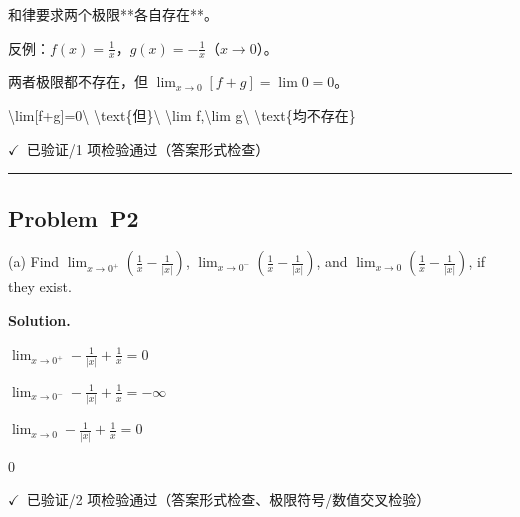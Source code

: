\documentclass[12pt, a4paper]{article}
\newcommand{\problem}[1]{\subsection*{Problem~#1}}
\newcommand{\solution}{%
  \par\noindent
  {\color{solutiongreen}\bfseries Solution.}\par
}
\newcommand{\verifyok}{\textcolor{solutiongreen}{\ensuremath{\checkmark}\ 已验证}}
\begin{document}
\begin{stepbox}
和律要求两个极限**各自存在**。
\end{stepbox}

\begin{stepbox}
反例：$f(x)=\frac1x$，$g(x)=-\frac1x$（$x\to0$）。
\end{stepbox}

\begin{stepbox}
两者极限都不存在，但 $\lim_{x\to0}[f+g]=\lim 0=0$。
\end{stepbox}

\begin{center}
\textbackslash{}lim[f+g]=0\textbackslash{} \textbackslash{}text\{但\}\textbackslash{} \textbackslash{}lim f,\textbackslash{}lim g\textbackslash{} \textbackslash{}text\{均不存在\}
\end{center}

\begin{verifybox}\small \verifyok{}/1 项检验通过（答案形式检查） \end{verifybox}

\vspace{0.8em}\hrule\vspace{0.8em}

\problem{P2}

\begin{stepbox}
(a) Find $\lim_{x \to 0^+}(\frac{1}{x} - \frac{1}{|x|})$, $\lim_{x \to 0^-}(\frac{1}{x} - \frac{1}{|x|})$, and $\lim_{x \to 0}(\frac{1}{x} - \frac{1}{|x|})$, if they exist.
\end{stepbox}

\solution

\begin{stepbox}
$\lim_{x \to 0^+} - \frac{1}{\left|{x}\right|} + \frac{1}{x} = 0$
\end{stepbox}

\begin{stepbox}
$\lim_{x \to 0^-} - \frac{1}{\left|{x}\right|} + \frac{1}{x} = -\infty$
\end{stepbox}

\begin{stepbox}
$\lim_{x \to 0} - \frac{1}{\left|{x}\right|} + \frac{1}{x} = 0$
\end{stepbox}

\begin{center}
$\boxed{0}$
\end{center}

\begin{verifybox}\small \verifyok{}/2 项检验通过（答案形式检查、极限符号/数值交叉检验） \end{verifybox}
\end{document}
